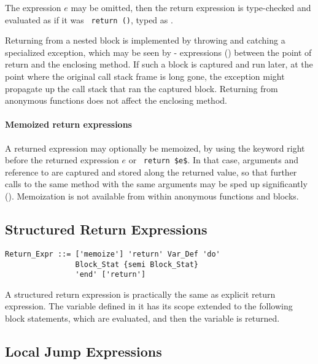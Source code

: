 The expression $e$ may be omitted, then the return expression  is type-checked and evaluated as if it was ~\lstinline!return ()!, typed as . 

Returning from a nested block is implemented by throwing and catching a specialized exception, which may be seen by - expressions () between the point of return and the enclosing method. If such a block is captured and run later, at the point where the original call stack frame is long gone, the exception might propagate up the call stack that ran the captured block. Returning from anonymous functions does not affect the enclosing method. 

\paragraph{Memoized return expressions}
A returned expression may optionally be memoized, by using the keyword  right before the returned expression $e$ or ~\lstinline!return $e$!. In that case, arguments and reference to  are captured and stored along the returned value, so that further calls to the same method with the same arguments may be sped up significantly (). Memoization is not available from within anonymous functions and blocks. 






\subsection{Structured Return Expressions}

\syntax\begin{lstlisting}
Return_Expr ::= ['memoize'] 'return' Var_Def 'do' 
                Block_Stat {semi Block_Stat} 
                'end' ['return']
\end{lstlisting}

A structured return expression is practically the same as explicit return expression. The variable defined in it has its scope extended to the following block statements, which are evaluated, and then the variable is returned. 






\subsection{Local Jump Expressions}
\label{sec:local-jump-expressions}

